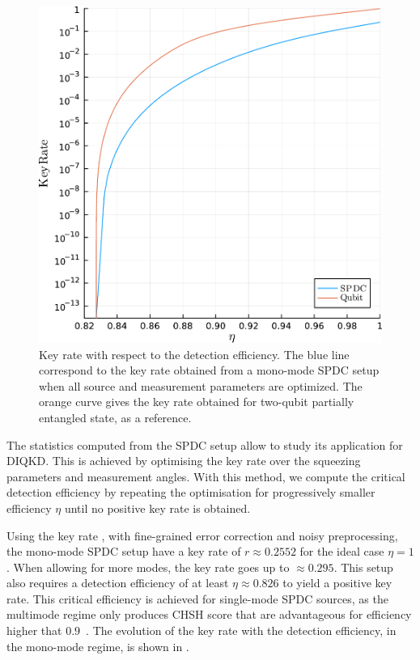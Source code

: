 \begin{figure}[ht!]
	\begin{center}
		\includegraphics[width=.95\textwidth]{chapters/deviceindependent/img/key_rate_spdc.pdf}
	\end{center}
	\caption{Key rate with respect to the detection efficiency. The blue line correspond to the key rate obtained from a mono-mode SPDC setup when all source and measurement parameters are optimized.
	The orange curve gives the key rate obtained for two-qubit partially entangled state, as a reference.}
	\label{fig:SPDC_kr}
\end{figure}

The statistics computed from the SPDC setup allow to study its application for DIQKD.
This is achieved by optimising the key rate over the squeezing parameters and measurement angles.
With this method, we compute the critical detection efficiency by repeating the optimisation for progressively smaller efficiency $\eta$ until no positive key rate is obtained.

Using the key rate , with fine-grained error correction and noisy preprocessing, the mono-mode SPDC setup have a key rate of $r\approx 0.2552$ for the ideal case $\eta=1$. 
When allowing for more modes, the key rate goes up to $\approx 0.295$.
This setup also requires a detection efficiency of at least $\eta\approx 0.826$ to yield a positive key rate.
This critical efficiency is achieved for single-mode SPDC sources, as the multimode regime only produces CHSH score that are advantageous for efficiency higher that $0.9$~\cite{Vivoli2015b}.
The evolution of the key rate with the detection efficiency, in the mono-mode regime, is shown in .


